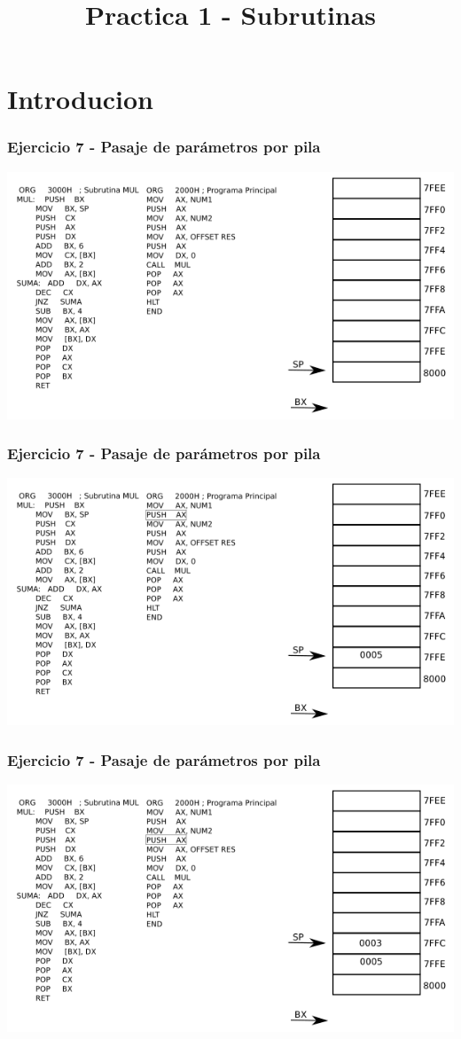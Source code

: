 \documentclass{beamer}
\title{Practica 1 - Subrutinas}
\begin{document}
\begin{frame}
\titlepage
\end{frame}

\section{Introducion}

\begin{frame}
\frametitle{Ejercicio 7 - Pasaje de parámetros por pila}
\includegraphics[scale=0.70]{imgs/imagen_001.png}
\end{frame}

\begin{frame}
\frametitle{Ejercicio 7 - Pasaje de parámetros por pila}
\includegraphics[scale=0.70]{imgs/imagen_002.png}
\end{frame}

\begin{frame}
\frametitle{Ejercicio 7 - Pasaje de parámetros por pila}
\includegraphics[scale=0.70]{imgs/imagen_003.png}
\end{frame}
\end{document}
